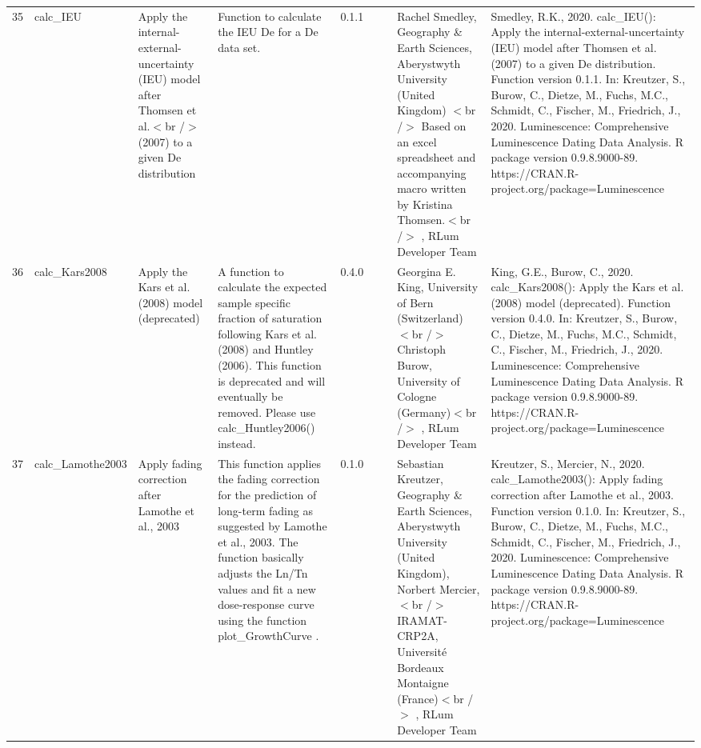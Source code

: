 \begin{table}[ht]
\begin{tabular}{rllllllll}
 \\ 
  35 & calc\_IEU & Apply the internal-external-uncertainty (IEU) model after Thomsen et al.$<$br /$>$ (2007) to a given De distribution & Function to calculate the IEU De for a De data set. & 0.1.1
 &  &  & Rachel Smedley, Geography \& Earth Sciences, Aberystwyth University (United Kingdom)  $<$br /$>$ Based on an excel spreadsheet and accompanying macro written by Kristina Thomsen.$<$br /$>$ , RLum Developer Team & Smedley, R.K., 2020. calc\_IEU(): Apply the internal-external-uncertainty (IEU) model after Thomsen et al. (2007) to a given De distribution. Function version 0.1.1. In: Kreutzer, S., Burow, C., Dietze, M., Fuchs, M.C., Schmidt, C., Fischer, M., Friedrich, J., 2020. Luminescence: Comprehensive Luminescence Dating Data Analysis. R package version 0.9.8.9000-89. https://CRAN.R-project.org/package=Luminescence
 \\ 
  36 & calc\_Kars2008 & Apply the Kars et al. (2008) model (deprecated) & A function to calculate the expected sample specific fraction of saturation following Kars et al. (2008) and Huntley (2006). This function is deprecated and will eventually be removed. Please use  calc\_Huntley2006()  instead. & 0.4.0
 &  &  & Georgina E. King, University of Bern (Switzerland)  $<$br /$>$ Christoph Burow, University of Cologne (Germany)$<$br /$>$ , RLum Developer Team & King, G.E., Burow, C., 2020. calc\_Kars2008(): Apply the Kars et al. (2008) model (deprecated). Function version 0.4.0. In: Kreutzer, S., Burow, C., Dietze, M., Fuchs, M.C., Schmidt, C., Fischer, M., Friedrich, J., 2020. Luminescence: Comprehensive Luminescence Dating Data Analysis. R package version 0.9.8.9000-89. https://CRAN.R-project.org/package=Luminescence
 \\ 
  37 & calc\_Lamothe2003 & Apply fading correction after Lamothe et al., 2003 & This function applies the fading correction for the prediction of long-term fading as suggested by Lamothe et al., 2003. The function basically adjusts the Ln/Tn values and fit a new dose-response curve using the function  plot\_GrowthCurve . & 0.1.0
 &  &  & Sebastian Kreutzer, Geography \& Earth Sciences, Aberystwyth University (United Kingdom), Norbert Mercier,$<$br /$>$ IRAMAT-CRP2A, Université Bordeaux Montaigne (France)$<$br /$>$ , RLum Developer Team & Kreutzer, S., Mercier, N., 2020. calc\_Lamothe2003(): Apply fading correction after Lamothe et al., 2003. Function version 0.1.0. In: Kreutzer, S., Burow, C., Dietze, M., Fuchs, M.C., Schmidt, C., Fischer, M., Friedrich, J., 2020. Luminescence: Comprehensive Luminescence Dating Data Analysis. R package version 0.9.8.9000-89. https://CRAN.R-project.org/package=Luminescence

\end{tabular}
\end{table}
